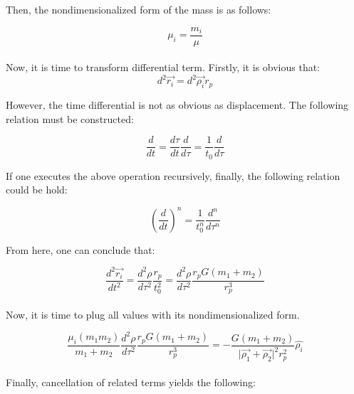 \documentclass[letterpaper,12pt]{article}
\begin{document}
Then, the nondimensionalized form of the mass is as follows:

\begin{equation*}
    \mu_i  = \frac{m_i}{\mu}
\end{equation*}

\paragraph{} Now, it is time to transform differential term. Firstly, it is obvious that:
\begin{equation*}
    d^2\vec{r_i} = d^2\vec{\rho_i} r_p 
\end{equation*}

However, the time differential is not as obvious as displacement. The following relation must be constructed:

\begin{equation*}
    \frac{d}{dt} = \frac{d\tau}{dt}\frac{d}{d\tau} = \frac{1}{t_0} \frac{d}{d\tau}
\end{equation*}

If one executes the above operation recursively, finally, the following relation could be hold:

\begin{equation*}
    \left( \frac{d}{dt} \right) ^n = \frac{1}{t_0^n} \frac{d^n}{d\tau^n}
\end{equation*}

From here, one can conclude that:

\begin{equation*}
    \frac{d^2\vec{r_i}}{dt^2} = \frac{d^2\rho}{d\tau^2} \frac{r_p}{t_0^2} =  \frac{d^2\rho}{d\tau^2} \frac{r_p G \left(m_1 + m_2\right)}{r_p^3}
\end{equation*}

\paragraph{} Now, it is time to plug all values with its nondimensionalized form.

\begin{equation*}
    \frac{\mu_i \left(m_1  m_2\right)}{m_1 + m_2} \frac{d^2\rho}{d\tau^2} \frac{r_p G \left(m_1 + m_2\right)}{r_p^3} = -\frac{G \left(m_1 + m_2\right)}{\lvert \vec{\rho_1} + \vec{\rho_2} \rvert^2 {r_p^2}}\hat{\rho_i}
\end{equation*}

\paragraph{} Finally, cancellation of related terms yields the following:
\end{document}
